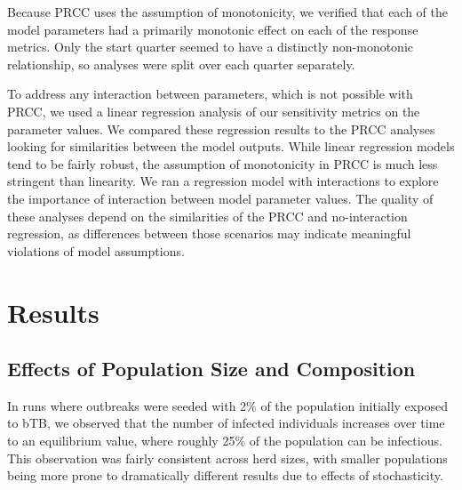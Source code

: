 \documentclass[number,preprint,review,12pt]{elsarticle}
\begin{document}
Because PRCC uses the assumption of monotonicity, we verified that each of the model parameters had a primarily monotonic effect on each of the response metrics. Only the start quarter seemed to have a distinctly non-monotonic relationship, so analyses were split over each quarter separately. 

To address any interaction between parameters, which is not possible with PRCC, we used a linear regression analysis of our sensitivity metrics on the parameter values. We compared these regression results to the PRCC analyses looking for similarities between the model outputs. While linear regression models tend to be fairly robust, the assumption of monotonicity in PRCC is much less stringent than linearity. We ran a regression model with interactions to explore the importance of interaction between model parameter values. The quality of these analyses depend on the similarities of the PRCC and no-interaction regression, as differences between those scenarios may indicate meaningful violations of model assumptions. 


\section{Results}
\subsection{Effects of Population Size and Composition}

In runs where outbreaks were seeded with 2\% of the population initially exposed to bTB, we observed that the number of infected individuals increases over time to an equilibrium value, where roughly 25\% of the population can be infectious. This observation was fairly consistent across herd sizes, with smaller populations being more prone to dramatically different results due to effects of stochasticity. 
\end{document}
